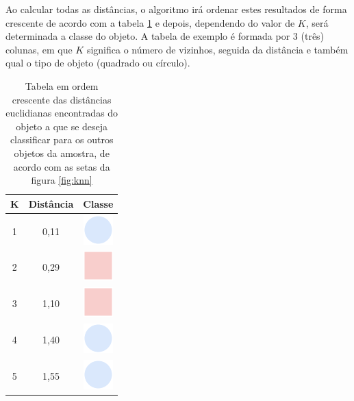 Ao calcular todas as distâncias, o algoritmo irá ordenar estes resultados de forma crescente de acordo com a tabela \ref{tab:exemploKNN} e depois, dependendo do valor de ${K}$, será determinada a classe do objeto. A tabela de exemplo é formada por 3 (três) colunas, em que ${K}$  significa o número de vizinhos, seguida da distância e também qual o tipo de objeto (quadrado ou círculo). 



\begin{table}[!ht]
\centering 
\begin{tabular}{|c|c|c|}
\hline \hline 
\rowcolor[HTML]{EFEFEF} 
K & Distância     & Classe \\ \hline
1 & 0,11       & \includegraphics[scale=0.2]{figs/circulo.png}       \\ \hline                    
2 & 0,29       &  \includegraphics[scale=0.2]{figs/quadrado.png}        \\ \hline
3 & 1,10       &  \includegraphics[scale=0.2]{figs/quadrado.png}   \\ \hline                    
4 & 1,40       &  \includegraphics[scale=0.2]{figs/circulo.png}     \\ \hline
5 & 1,55       &  \includegraphics[scale=0.2]{figs/circulo.png}     \\ \hline                    
\end{tabular}
\caption{Tabela em ordem crescente das distâncias euclidianas encontradas do objeto a que se deseja classificar para os outros objetos da amostra, de acordo com as setas da figura \ref{fig:knn}}
\label{tab:exemploKNN}
\end{table}


